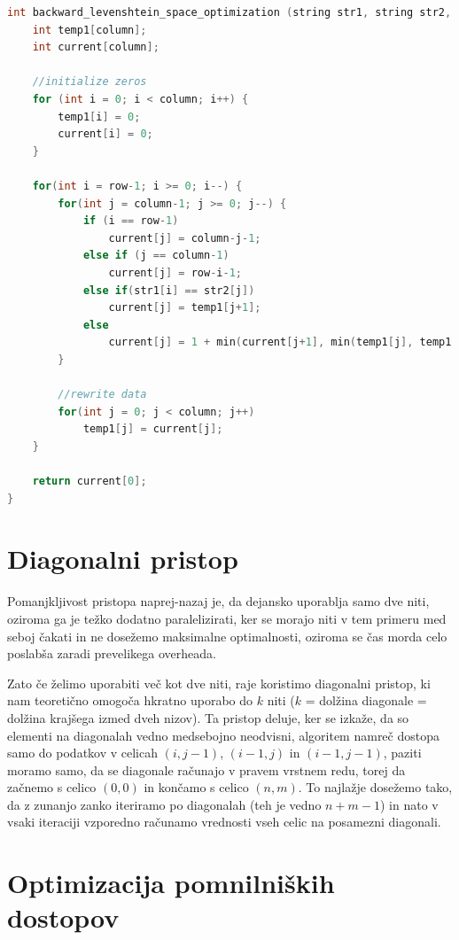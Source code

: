 \documentclass[a4paper,12pt,openright]{book}
\begin{document}
\begin{lstlisting}[language=C++, caption={Prostorska optimizacija}, captionpos=b, label=spaceOptimization]
int backward_levenshtein_space_optimization (string str1, string str2, int row, int column) {
    int temp1[column]; 
    int current[column];

    //initialize zeros
    for (int i = 0; i < column; i++) {
        temp1[i] = 0;
        current[i] = 0;
    }

    for(int i = row-1; i >= 0; i--) {
        for(int j = column-1; j >= 0; j--) {
            if (i == row-1)
                current[j] = column-j-1;
            else if (j == column-1)
                current[j] = row-i-1;
            else if(str1[i] == str2[j])
                current[j] = temp1[j+1];
            else
                current[j] = 1 + min(current[j+1], min(temp1[j], temp1[j+1]));
        }

        //rewrite data
        for(int j = 0; j < column; j++) 
            temp1[j] = current[j];
    }

    return current[0];
}
\end{lstlisting}

\section{Diagonalni pristop}

Pomanjkljivost pristopa naprej-nazaj je, da dejansko uporablja samo dve niti, oziroma ga je težko dodatno paralelizirati, ker se morajo niti v tem primeru med seboj čakati in ne dosežemo maksimalne optimalnosti, oziroma se čas morda celo poslabša zaradi prevelikega overheada. 

Zato če želimo uporabiti več kot dve niti, raje koristimo diagonalni pristop, ki nam teoretično omogoča hkratno uporabo do $k$ niti ($k$ = dolžina diagonale = dolžina krajšega izmed dveh nizov). Ta pristop deluje, ker se izkaže, da so elementi na diagonalah vedno medsebojno neodvisni, algoritem namreč dostopa samo do podatkov v celicah $(i, j-1)$, $(i-1, j)$ in $(i-1, j-1)$, paziti moramo samo, da se diagonale računajo v pravem vrstnem redu, torej da začnemo s celico $(0, 0)$ in končamo s celico $(n, m)$. To najlažje dosežemo tako, da z zunanjo zanko iteriramo po diagonalah (teh je vedno $n+m-1$) in nato v vsaki iteraciji vzporedno računamo vrednosti vseh celic na posamezni diagonali. 

\section{Optimizacija pomnilniških dostopov}
\end{document}
